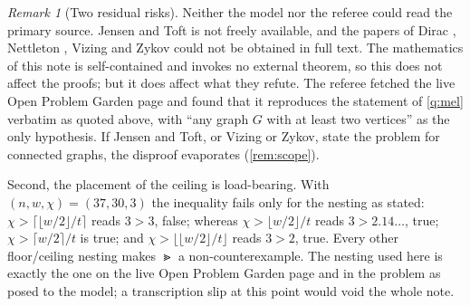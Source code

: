 \documentclass[11pt,a4paper]{article}
\theoremstyle{plain}
\theoremstyle{definition}
\theoremstyle{remark}
\newtheorem{remark}[theorem]{Remark}
\newcommand{\fl}[1]{\lfloor #1\rfloor}
\newcommand{\ce}[1]{\lceil #1\rceil}
\begin{document}
\begin{remark}[Two residual risks]\label{rem:risks}
Neither the model nor the referee could read the primary source. Jensen and Toft \cite[p.~90]{JT} is not freely available, and the papers of Dirac \cite{D}, Nettleton \cite{N}, Vizing \cite{V} and Zykov \cite{Z} could not be obtained in full text. The mathematics of this note is self-contained and invokes no external theorem, so this does not affect the proofs; but it does affect what they refute. The referee fetched the live Open Problem Garden page and found that it reproduces the statement of \cref{q:mel} verbatim as quoted above, with ``any graph $G$ with at least two vertices'' as the only hypothesis. If Jensen and Toft, or Vizing or Zykov, state the problem for connected graphs, the disproof evaporates (\cref{rem:scope}).

Second, the placement of the ceiling is load-bearing. With $(n,w,\chi)=(37,30,3)$ the inequality fails only for the nesting as stated: $\chi>\ce{\fl{w/2}/t}$ reads $3>3$, false; whereas $\chi>\fl{w/2}/t$ reads $3>2.14\ldots$, true; $\chi>\ce{w/2}/t$ is true; and $\chi>\fl{\fl{w/2}/t}$ reads $3>2$, true. Every other floor/ceiling nesting makes $\Gt$ a non-counterexample. The nesting used here is exactly the one on the live Open Problem Garden page and in the problem as posed to the model; a transcription slip at this point would void the whole note.
\end{remark}
\end{document}
